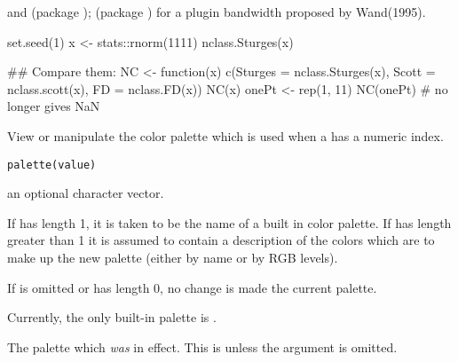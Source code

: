 %
\begin{SeeAlso}\relax
{} and  (package
);   (package
) for a plugin bandwidth proposed by Wand(1995).
\end{SeeAlso}
%
\begin{Examples}
\begin{ExampleCode}
set.seed(1)
x <- stats::rnorm(1111)
nclass.Sturges(x)

## Compare them:
NC <- function(x) c(Sturges = nclass.Sturges(x),
      Scott = nclass.scott(x), FD = nclass.FD(x))
NC(x)
onePt <- rep(1, 11)
NC(onePt) # no longer gives NaN
\end{ExampleCode}
\end{Examples}
%
\begin{Description}\relax
View or manipulate the color palette which is used when a 
has a numeric index.
\end{Description}
%
\begin{Usage}
\begin{verbatim}
palette(value)
\end{verbatim}
\end{Usage}
%
\begin{Arguments}
\begin{ldescription}
\item[\code{value}] an optional character vector.
\end{ldescription}
\end{Arguments}
%
\begin{Details}\relax
If  has length 1, it is taken to be the name of
a built in color palette.  If  has length greater
than 1 it is assumed to contain a description of the colors
which are to make up the new palette (either by name or
by RGB levels).

If  is omitted or has length 0, no change is made
the current palette.

Currently, the only built-in palette is .
\end{Details}
%
\begin{Value}
The palette which \emph{was} in effect.  This is 
unless the argument is omitted.
\end{Value}

